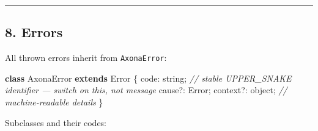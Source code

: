 \documentclass[
  nobib]{tufte-handout}
\newenvironment{Shaded}{}{}
\newcommand{\BuiltInTok}[1]{\textcolor[rgb]{0.00,0.50,0.00}{#1}}
\newcommand{\CommentTok}[1]{\textcolor[rgb]{0.38,0.63,0.69}{\textit{#1}}}
\newcommand{\DataTypeTok}[1]{\textcolor[rgb]{0.56,0.13,0.00}{#1}}
\newcommand{\KeywordTok}[1]{\textcolor[rgb]{0.00,0.44,0.13}{\textbf{#1}}}
\newcommand{\NormalTok}[1]{#1}
\newcommand{\OperatorTok}[1]{\textcolor[rgb]{0.40,0.40,0.40}{#1}}
\begin{document}
\begin{center}\rule{0.5\linewidth}{0.5pt}\end{center}

\subsection{8. Errors}\label{errors}

All thrown errors inherit from \texttt{AxonaError}:

\begin{Shaded}
\begin{Highlighting}[]
\KeywordTok{class}\NormalTok{ AxonaError }\KeywordTok{extends} \BuiltInTok{Error}\NormalTok{ \{}
  \DataTypeTok{code}\OperatorTok{:}\NormalTok{     string}\OperatorTok{;}   \CommentTok{// stable UPPER\_SNAKE identifier — switch on this, not message}
\NormalTok{  cause}\OperatorTok{?:}   \BuiltInTok{Error}\OperatorTok{;}
\NormalTok{  context}\OperatorTok{?:}\NormalTok{ object}\OperatorTok{;}   \CommentTok{// machine{-}readable details}
\NormalTok{\}}
\end{Highlighting}
\end{Shaded}

Subclasses and their codes:
\end{document}
